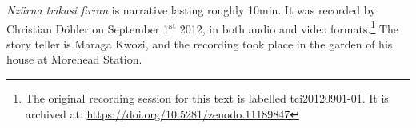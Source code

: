 \textit{Nzürna trikasi firran} is narrative lasting roughly 10min. It was recorded by Christian Döhler on September 1\textsuperscript{st} 2012, in both audio and video formats.\footnote{The original recording session for this text is labelled tci20120901-01. It is archived at: \href{https://doi.org/10.5281/zenodo.11189847}{https://doi.org/10.5281/zenodo.11189847}} The story teller is Maraga Kwozi, and the recording took place in the garden of his house at Morehead Station.